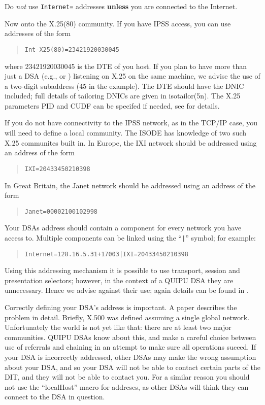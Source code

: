 Do {\em not} use \verb+Internet=+ addresses {\bf unless} you are connected to the Internet.


Now onto the X.25(80) community.
If you have IPSS access, you can use addresses of the form
\begin{quote}\begin{verbatim}
Int-X25(80)=23421920030045
\end{verbatim}\end{quote}
where 23421920030045 is the DTE of you host.
If you plan to have more than just a DSA (e.g.,  or
) listening on X.25 on the same machine, we advise 
the use of a two-digit
subaddress (45 in the example).
The DTE should have the DNIC included; full details of tailoring
DNICs are given in \man isotailor(5n).
The X.25 parameters PID and CUDF can be specifed if needed, see
\cite{String.Addresses} for details.

If you do not have connectivity to the IPSS network, as in the TCP/IP
case, you will need to define a local community.
The ISODE has knowledge of two such X.25 communites built in.
In Europe, the IXI network should be addressed using an address of the form
\begin{quote}\begin{verbatim}
IXI=20433450210398
\end{verbatim}\end{quote}
In Great Britain, the Janet network should be addressed using an
address of the form
\begin{quote}\begin{verbatim}
Janet=00002100102998
\end{verbatim}\end{quote}

Your DSAs address should contain a component for every network you
have access to.  Multiple components can be linked using the
``\verb+|+'' symbol; for example:
\begin{quote}\begin{verbatim}
Internet=128.16.5.31+17003|IXI=20433450210398
\end{verbatim}\end{quote}


Using this addressing mechanism it is possible to use transport,
session and presentation selectors; however, in the context of a QUIPU
DSA they are unnecessary. Hence we advise against their use; again
details can be found in 
\cite{String.Addresses}.


Correctly defining your DSA's address is important. A paper 
\cite{QUIPU.Navigate} describes the problem in detail.  Briefly, X.500
was defined assuming a single global network. Unfortunately the world
is not yet like that: there are at least two major communities.  QUIPU
DSAs know about this, and make a careful choice between use of
referrals and chaining in an attempt to make sure all operations
suceed.  If your DSA is incorrectly addressed, other DSAs may make the
wrong assumption about your DSA, and so your DSA will not be able to contact
certain parts of the DIT, and they will not be able to contact you.
For a similar reason you should not use the ``localHost'' macro for
addreses, as other DSAs will think they can connect to the DSA in question.


